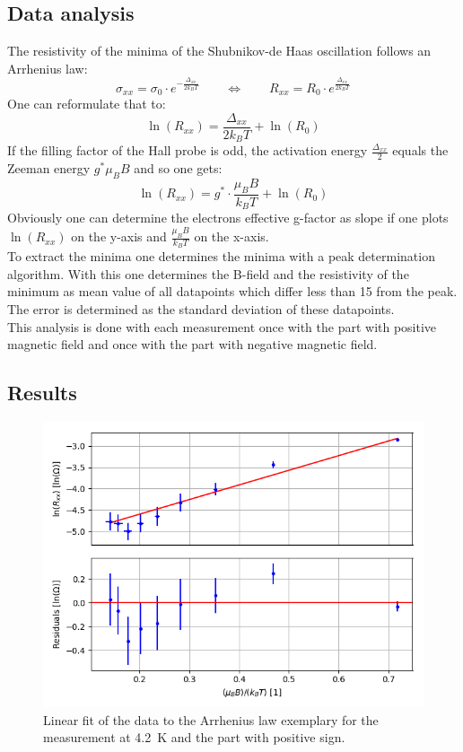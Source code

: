 \documentclass[12pt,a4paper]{article}
\begin{document}
\subsection{Data analysis}
The resistivity of the minima of the Shubnikov-de Haas oscillation follows an Arrhenius law:
\begin{equation*}
\sigma _{xx} = \sigma _0 \cdot e^{- \frac{\Delta _{xx}}{2 k_B T}} \qquad \Leftrightarrow \qquad R _{xx} = R _0 \cdot e^{\frac{\Delta _{xx}}{2 k_B T}}
\end{equation*}
One can reformulate that to:
\begin{equation*}
\ln (R _{xx}) = \dfrac{\Delta _{xx}}{2 k_B T} + \ln (R _{0})
\end{equation*}
If the filling factor of the Hall probe is odd, the activation energy $\frac{\Delta _{xx}}{2}$ equals the Zeeman energy $g^* \mu _B B$ and so one gets:
\begin{equation*}
\ln (R _{xx}) = g^* \cdot \dfrac{\mu _B B}{k_B T} + \ln (R _{0})
\end{equation*}
Obviously one can determine the electrons effective g-factor as slope if one plots $\ln (R _{xx})$ on the y-axis and $\frac{\mu _B B}{k_B T}$ on the x-axis. \\
To extract the minima one determines the minima with a peak determination algorithm. With this one determines the B-field and the resistivity of the minimum as mean value of all datapoints which differ less than \SI{15}{\Omega} from the peak. The error is determined as the standard deviation of these datapoints. \\
This analysis is done with each measurement once with the part with positive magnetic field and once with the part with negative magnetic field.


\subsection{Results}

\begin{figure} [H]
\centering
\includegraphics[scale=0.8]{Bilder/Elektron_g/4_2/lin_fit_Arrhenius_law_1.PNG}
\caption{Linear fit of the data to the Arrhenius law exemplary for the measurement at \SI{4.2}{K} and the part with positive sign.}
\label{fig:g-factor_lin_fit}
\end{figure}
\end{document}
